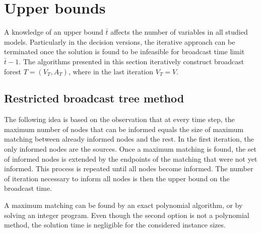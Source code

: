 \section{Upper bounds} \label{sec:ub}

A knowledge of an upper bound $\bar{t}$ affects the number of variables in all studied models. 
Particularly in the decision versions, the iterative approach can be terminated once the solution is found to be infeasible for broadcast time limit $\bar{t}-1$.
The algorithms presented in this section iteratively construct broadcast forest $T=(V_T,A_T)$, where in the last iteration $V_T=V$.

\subsection{Restricted broadcast tree method}

The following idea is based on the observation that at every time step, the maximum number of nodes that can be informed equals the size of maximum matching between already informed nodes and the rest.
In the first iteration, the only informed nodes are the sources.
Once a maximum matching is found, the set of informed nodes is extended by the endpoints of the matching that were not yet informed.
This process is repeated until all nodes become informed.
The number of iteration necessary to inform all nodes is then the upper bound on the broadcast time.

A maximum matching can be found by an exact polynomial algorithm, or by solving an integer program.
Even though the second option is not a polynomial method, the solution time is negligible for the considered instance sizes.

